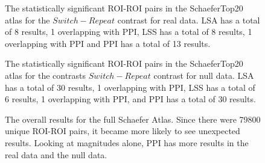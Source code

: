 \documentclass[phd,appendix,figures]{uithesis}
\begin{document}
\begin{figure}[H]
  \ContinuedFloat
  \centering


  \caption[All contrasts for all atlases for all data for LSA/LSS versus PPI continued...]{
      The statistically significant ROI-ROI pairs in the SchaeferTop20 atlas
      for the $Switch - Repeat$ contrast for real data.
      LSA has a total of 8 results, 1 overlapping with PPI,
      LSS has a total of 8 results, 1 overlapping with PPI and
      PPI has a total of 13 results.
  }
  \label{fig:data-real_type-brain_atlas-schaeferbest_contrast-switchxrepeat}
\end{figure}

\begin{figure}[H]
  \ContinuedFloat
  \centering


  \caption[All contrasts for all atlases for all data for LSA/LSS versus PPI continued...]{
      The statistically significant ROI-ROI pairs in the SchaeferTop20 atlas
      for the contrasts $Switch - Repeat$ contrast for null data.
      LSA has a total of 30 results, 1 overlapping with PPI,
      LSS has a total of 6 results, 1 overlapping with PPI,
      and PPI has a total of 30 results.
  }
  \label{fig:data-null_type-brain_atlas-schaeferbest_contrast-switchxrepeat}
\end{figure}

\begin{figure}[H]
  \centering


  \caption[Comparison of LSA/LSS/PPI using participant data and the Schaefer atlas]{
      The overall results for the full Schaefer Atlas.
      Since there were 79800 unique ROI-ROI pairs, it became more likely
      to see unexpected results.
      Looking at magnitudes alone, PPI has more results in the real data
      and the null data.
  }
  \label{fig:schaefer_binomial_ppi}
\end{figure}
\end{document}
